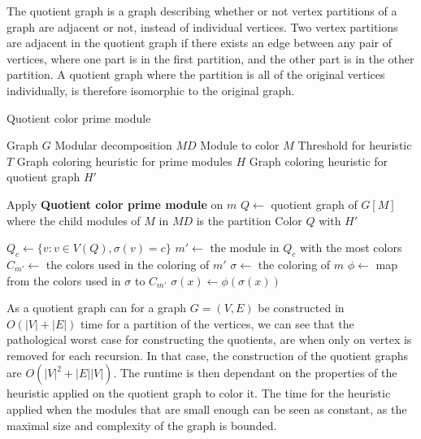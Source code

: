 \documentclass[a4paper]{article}
\begin{document}
The quotient graph is a graph describing whether or not vertex partitions of a
graph are adjacent or not, instead of individual vertices. Two vertex
partitions are adjacent in the quotient graph if there exists an edge between
any pair of vertices, where one part is in the first partition, and the other
part is in the other partition. A quotient graph where the partition is all of
the original vertices individually, is therefore isomorphic to the original
graph.


\begin{algorithm}[H]
  \caption{Quotient color prime module}
  \begin{algorithmic}[1]
    \REQUIRE Graph $G$
    \REQUIRE Modular decomposition $MD$
    \REQUIRE Module to color $M$
    \REQUIRE Threshold for heuristic $T$
    \REQUIRE Graph coloring heuristic for prime modules $H$
    \REQUIRE Graph coloring heuristic for quotient graph $H'$

        \RETURN
    \ENDIF
        \STATE Apply \textbf{Quotient color prime module} on $m$
    \ENDFOR
    \STATE $Q \leftarrow $ quotient graph of $G[M]$ where the child modules of $M$ in $MD$ is the partition
    \STATE Color $Q$ with $H'$

        \STATE $Q_c \leftarrow \{ v : v \in V(Q), \sigma(v) = c\}$
        \STATE $m' \leftarrow$ the module in $Q_c$ with the most colors
        \STATE $C_{m'} \leftarrow$ the colors used in the coloring of $m'$
            \STATE $\sigma \leftarrow $ the coloring of $m$
            \STATE $\phi \leftarrow $ map from the colors used in $\sigma$ to $C_{m'}$
                \STATE $\sigma(x) \leftarrow \phi(\sigma(x))$
            \ENDFOR
        \ENDFOR
    \ENDFOR

  \end{algorithmic}
\end{algorithm}

As a quotient graph can for a graph $G = (V,E)$ be constructed in
$O(|V|+|E|)$ time for a partition of the vertices, we can see that the pathological
worst case for constructing the quotients, are when only on vertex is removed
for each recursion. In that case, the construction of the quotient graphs are
$O(|V|^2+|E||V|)$. The runtime is then dependant on the properties of the
heuristic applied on the quotient graph to color it. The time for the heuristic
applied when the modules that are small enough can be seen as constant, as the
maximal size and complexity of the graph is bounded. 
\end{document}
